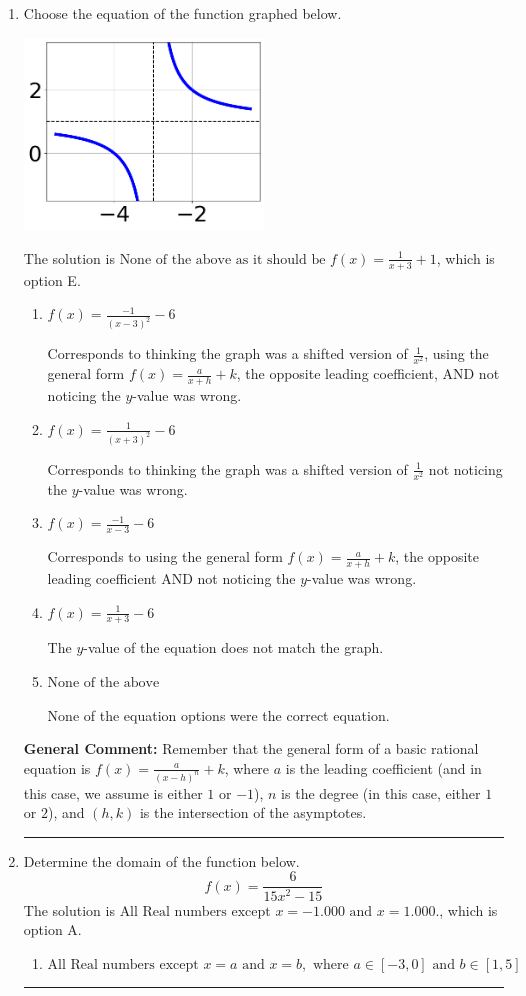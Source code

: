 \documentclass{extbook}[14pt]
\newcommand{\litem}[1]{\item #1

\rule{\textwidth}{0.4pt}}
\begin{document}
\begin{enumerate}\litem{
Choose the equation of the function graphed below.

\begin{center}
    \includegraphics[width=0.5\textwidth]{../Figures/rationalGraphToEquationCopyB.png}
\end{center}



The solution is \( \text{None of the above as it should be } f(x) = \frac{1}{x + 3} + 1 \), which is option E.\begin{enumerate}[label=\Alph*.]
\item \( f(x) = \frac{-1}{(x - 3)^2} - 6 \)

Corresponds to thinking the graph was a shifted version of $\frac{1}{x^2}$, using the general form $f(x) = \frac{a}{x+h}+k$, the opposite leading coefficient, AND not noticing the $y$-value was wrong.
\item \( f(x) = \frac{1}{(x + 3)^2} - 6 \)

Corresponds to thinking the graph was a shifted version of $\frac{1}{x^2}$ not noticing the $y$-value was wrong.
\item \( f(x) = \frac{-1}{x - 3} - 6 \)

Corresponds to using the general form $f(x) = \frac{a}{x+h}+k$, the opposite leading coefficient AND not noticing the $y$-value was wrong.
\item \( f(x) = \frac{1}{x + 3} - 6 \)

The $y$-value of the equation does not match the graph.
\item \( \text{None of the above} \)

None of the equation options were the correct equation.
\end{enumerate}

\textbf{General Comment:} Remember that the general form of a basic rational equation is $ f(x) = \frac{a}{(x-h)^n} + k$, where $a$ is the leading coefficient (and in this case, we assume is either $1$ or $-1$), $n$ is the degree (in this case, either $1$ or $2$), and $(h, k)$ is the intersection of the asymptotes.
}
\litem{
Determine the domain of the function below.
\[ f(x) = \frac{6}{15x^{2} -15} \]
The solution is \( \text{All Real numbers except } x = -1.000 \text{ and } x = 1.000. \), which is option A.\begin{enumerate}[label=\Alph*.]
\item \( \text{All Real numbers except } x = a \text{ and } x = b, \text{ where } a \in [-3, 0] \text{ and } b \in [1, 5] \)


\end{enumerate}}
\end{enumerate}
\end{document}
